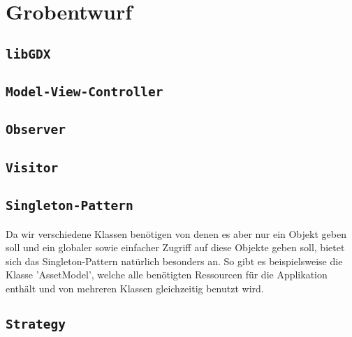 \section{Grobentwurf}

\subsection{\texttt{libGDX}}

\subsection{\texttt{Model-View-Controller}}

\subsection{\texttt{Observer}}

\subsection{\texttt{Visitor}}

\subsection{\texttt{Singleton-Pattern}}
Da wir verschiedene Klassen benötigen von denen es aber nur ein Objekt geben soll und ein globaler sowie einfacher Zugriff auf diese Objekte geben soll, bietet sich das Singleton-Pattern natürlich besonders an. So gibt es beispielsweise die Klasse 'AssetModel', welche alle benötigten Ressourcen für die Applikation enthält und von mehreren Klassen gleichzeitig benutzt wird.


\subsection{\texttt{Strategy}}
